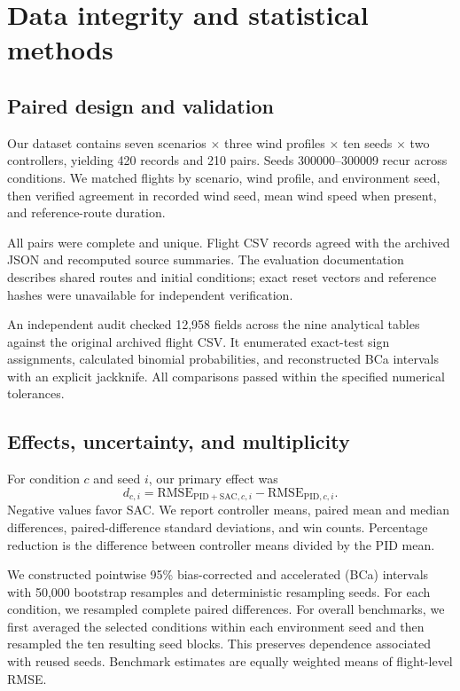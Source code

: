 \documentclass[11pt,a4paper]{article}
\begin{document}
\section{Data integrity and statistical methods}
\subsection{Paired design and validation}
Our dataset contains seven scenarios $\times$ three wind profiles $\times$ ten seeds $\times$ two controllers, yielding 420 records and 210 pairs. Seeds 300000--300009 recur across conditions. We matched flights by scenario, wind profile, and environment seed, then verified agreement in recorded wind seed, mean wind speed when present, and reference-route duration.

All pairs were complete and unique. Flight CSV records agreed with the archived JSON and recomputed source summaries. The evaluation documentation describes shared routes and initial conditions; exact reset vectors and reference hashes were unavailable for independent verification.

An independent audit checked 12,958 fields across the nine analytical tables against the original archived flight CSV. It enumerated exact-test sign assignments, calculated binomial probabilities, and reconstructed BCa intervals with an explicit jackknife. All comparisons passed within the specified numerical tolerances.

\subsection{Effects, uncertainty, and multiplicity}
For condition $c$ and seed $i$, our primary effect was
\begin{equation}
d_{c,i}=\mathrm{RMSE}_{\mathrm{PID+SAC},c,i}-\mathrm{RMSE}_{\mathrm{PID},c,i}.
\end{equation}
Negative values favor SAC. We report controller means, paired mean and median differences, paired-difference standard deviations, and win counts. Percentage reduction is the difference between controller means divided by the PID mean.

We constructed pointwise 95\% bias-corrected and accelerated (BCa) intervals with 50,000 bootstrap resamples and deterministic resampling seeds\cite{bootstrap}. For each condition, we resampled complete paired differences. For overall benchmarks, we first averaged the selected conditions within each environment seed and then resampled the ten resulting seed blocks. This preserves dependence associated with reused seeds. Benchmark estimates are equally weighted means of flight-level RMSE.
\end{document}
